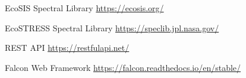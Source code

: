 \documentclass[a4paper,12pt]{article}
\begin{document}
\noindent [6] EcoSIS Spectral Library \newline \url{https://ecosis.org/}\newline

\noindent [7] EcoSTRESS Spectral Library \newline \url{https://speclib.jpl.nasa.gov/}\newline

\noindent [8] REST API \newline \url{https://restfulapi.net/}\newline 

\noindent [9] Falcon Web Framework \newline \url{https://falcon.readthedocs.io/en/stable/}\newline 
\end{document}
